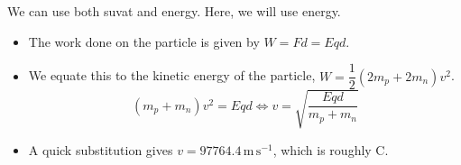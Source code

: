 \documentclass[a4paper,12pt]{article}
\begin{document}
We can use both suvat and energy. Here, we will use energy.
\begin{itemize}
  \item The work done on the particle is given by $W = Fd = Eqd$.
  \item We equate this to the kinetic energy of the particle, $W = \dfrac{1}{2}(2m_p + 2m_n)v^2$.
        $$(m_p + m_n)v^2 = Eqd \iff v = \sqrt{\frac{Eqd}{m_p + m_n}}$$
  \item A quick substitution gives $v = 97764.4 \, \mathrm{m \, s^{-1}}$, which is roughly C.
\end{itemize}
\end{document}
